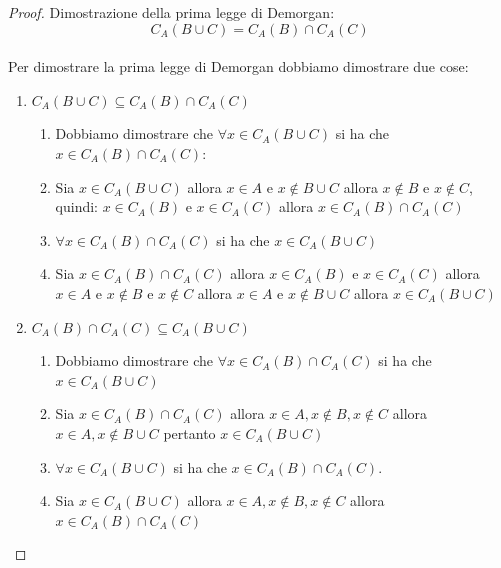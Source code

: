 \documentclass[12pt, letterpaper]{report}
\begin{document}
	\begin{proof}{Dimostrazione della prima legge di Demorgan: \[C_A(B \cup C) = C_A(B) \cap C_A(C)\]}	\quad \\
		Per dimostrare la prima legge di Demorgan dobbiamo dimostrare due cose:
		\begin{enumerate}
			\item $C_{A}(B \cup C) \subseteq C_{A}(B) \cap C_{A}(C)$
				\begin{enumerate}
					\item Dobbiamo dimostrare che $\forall x \in C_{A}(B \cup C)$ si ha che $x \in C_{A}(B) \cap C_{A}(C)$:
					\item Sia $x \in C_{A}(B \cup C)$ allora $x \in A$ e $x \notin B \cup C$ allora $x \notin B$ e $x \notin C$, quindi: $x \in C_{A}(B)$ e $x \in C_{A}(C)$ allora $x \in C_{A}(B) \cap C_{A}(C)$
					\item $\forall x \in C_{A}(B) \cap C_{A}(C)$ si ha che $x \in C_{A}(B \cup C)$
					\item Sia $x \in C_{A}(B) \cap C_{A}(C)$ allora $x \in C_{A}(B)$ e $x \in C_{A}(C)$ allora $x \in A$ e $x \notin B$ e $x \notin C$ allora $x \in A$ e $x \notin B \cup C$ allora $x \in C_{A}(B \cup C)$
				\end{enumerate}
			\item $C_{A}(B) \cap C_{A}(C) \subseteq C_{A}(B \cup C)$
				\begin{enumerate}
					\item Dobbiamo dimostrare che $\forall x \in C_{A}(B) \cap C_{A}(C)$ si ha che $x \in C_{A}(B \cup C)$
					\item Sia $x \in C_{A}(B) \cap C_{A}(C)$ allora $x \in A, x \notin B, x \notin C$ allora $x \in A, x \notin B \cup C$ pertanto $x \in C_{A}(B \cup C)$
					\item $\forall x \in C_{A}(B \cup C)$ si ha che $x \in C_{A}(B) \cap C_{A}(C)$.
					\item Sia $x \in C_{A}(B \cup C)$ allora $x \in A, x \notin B, x \notin C$ allora $x \in C_{A}(B) \cap C_{A}(C)$
				\end{enumerate}
		\end{enumerate}
	\end{proof}
\end{document}
